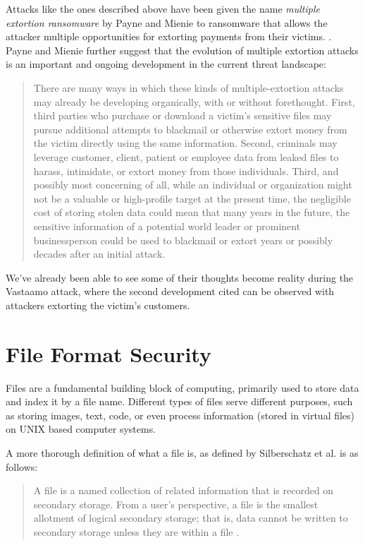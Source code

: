 Attacks like the ones described above have been given the name \emph{multiple extortion ransomware} by Payne and
Mienie to ransomware that allows the attacker multiple opportunities for extorting payments from their victims.
\cite{multiple-extortion-ransomware}.
Payne and Mienie further suggest that the evolution of multiple extortion attacks is an important and ongoing
development in the current threat landscape:
\begin{quote}
  There are many ways in which these kinds of multiple-extortion attacks may already be developing organically,
  with or without forethought. First, third parties who purchase or download a victim's sensitive files may pursue
  additional attempts to blackmail or otherwise extort money from the victim directly using the same information.
  Second, criminals may leverage customer, client, patient or employee data from leaked files to harass,
  intimidate, or extort money from those individuals. Third, and possibly most concerning of all, while an individual
  or organization might not be a valuable or high-profile target at the present time, the negligible cost of storing
  stolen data could mean that many years in the future, the sensitive information of a potential world leader or
  prominent businessperson could be used to blackmail or extort years or possibly decades after an initial attack.
  \cite{multiple-extortion-ransomware} %
\end{quote}
We've already been able to see some of their thoughts become reality during the Vastaamo attack, where the second
development cited can be observed with attackers extorting the victim's customers.


\section{File Format Security}
Files are a fundamental building block of computing, primarily used to store data and index it by a file name.
Different types of files serve different purposes, such as storing images, text, code, or even process 
information (stored in virtual files) on UNIX based computer systems.

A more thorough definition of what a file is, as defined by Silberschatz et al. is as follows:
\begin{quote}
  A file is a named collection of related information that is recorded on secondary storage. From a user's perspective, 
  a file is the smallest allotment of logical secondary storage; that is, data cannot be written to secondary storage 
  unless they are within a file \cite[p.~422]{operating-system-concepts}.
\end{quote}

